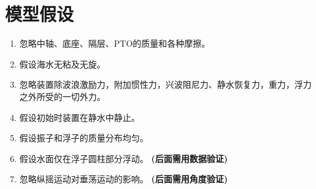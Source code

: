 \documentclass[withoutpreface,bwprint]{cumcmthesis} %
\begin{document}
    \section{模型假设}
    \begin{enumerate}
        \item 忽略中轴、底座、隔层、PTO的质量和各种摩擦。
        \item 假设海水无粘及无旋。
        \item 忽略装置除波浪激励力，附加惯性力，兴波阻尼力、静水恢复力，重力，浮力之外所受的一切外力。
        \item 假设初始时装置在静水中静止。
        \item 假设振子和浮子的质量分布均匀。
        \item 假设水面仅在浮子圆柱部分浮动。 \textbf{(后面需用数据验证)}
        \item 忽略纵摇运动对垂荡运动的影响。 \textbf{(后面需用角度验证)}
    \end{enumerate}
\end{document}
